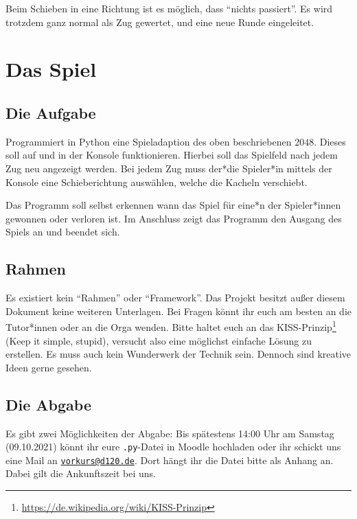 \documentclass[ngerman,accentcolor=3c,colorbacktitle,12pt,T1]{tudaexercise}
\begin{document}
Beim Schieben in eine Richtung ist es möglich, dass \enquote{nichts passiert}.
Es wird trotzdem ganz normal als Zug gewertet, und eine neue Runde eingeleitet.


\section*{Das Spiel}
\subsection*{Die Aufgabe}
Programmiert in Python eine Spieladaption des oben beschriebenen $2048$.
Dieses soll auf und in der Konsole funktionieren.
Hierbei soll das Spielfeld nach jedem Zug neu angezeigt werden.
Bei jedem Zug muss der*die Spieler*in mittels der Konsole eine Schieberichtung auswählen, welche die Kacheln verschiebt.

Das Programm soll selbst erkennen wann das Spiel für eine*n der Spieler*innen gewonnen oder verloren ist.
Im Anschluss zeigt das Programm den Ausgang des Spiels an und beendet sich.

\subsection*{Rahmen}
Es existiert kein \enquote{Rahmen} oder \enquote{Framework}.
Das Projekt besitzt außer diesem Dokument keine weiteren Unterlagen.
Bei Fragen könnt ihr euch am besten an die Tutor*innen oder an die Orga wenden.
Bitte haltet euch an das KISS-Prinzip\footnote[2]{\url{https://de.wikipedia.org/wiki/KISS-Prinzip}} (Keep it simple, stupid), versucht also eine möglichst einfache Lösung zu erstellen.
Es muss auch kein Wunderwerk der Technik sein.
Dennoch sind kreative Ideen gerne gesehen.

\subsection*{Die Abgabe}
Es gibt zwei Möglichkeiten der Abgabe: Bis spätestens 14:00 Uhr am Samstag (09.10.2021) könnt ihr eure \texttt{.py}-Datei in Moodle hochladen oder ihr schickt uns eine Mail an \href{mailto:vorkurs@d120.de}{\nolinkurl{vorkurs@d120.de}}.
Dort hängt ihr die Datei bitte als Anhang an.
Dabei gilt die Ankunftszeit bei uns.
\end{document}
